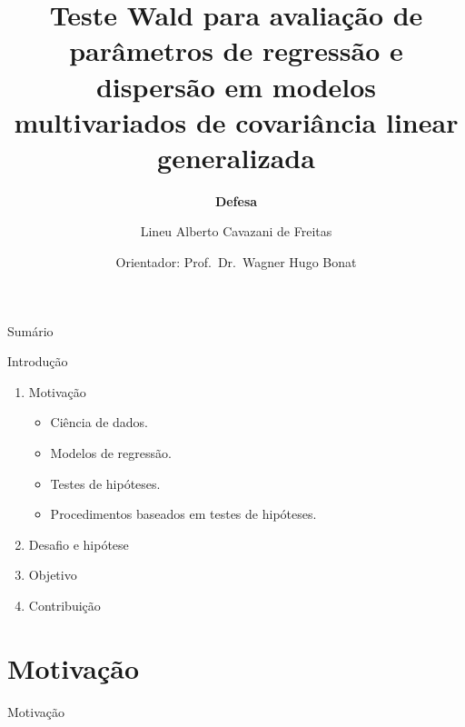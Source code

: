 \documentclass[
  ignorenonframetext,
  serif,
  professionalfont,
  usenames,
  dvipsnames,
  aspectratio = 169]{beamer}
\title{\textbf{Teste Wald para avaliação de parâmetros de regressão e dispersão em modelos multivariados de covariância linear generalizada}\newline}
\subtitle{\textbf{Defesa}}
\author{Lineu Alberto Cavazani de Freitas\newline \and Orientador:
Prof.~Dr.~Wagner Hugo Bonat}
\date{}
\institute{PPG Informática UFPR}
\begin{document}
\frame{\titlepage}

\begin{frame}
\end{frame}

\begin{frame}{Sumário}
\protect\hypertarget{sumuxe1rio}{}
\tableofcontents
\end{frame}

\begin{frame}{Introdução}
\protect\hypertarget{introduuxe7uxe3o}{}
\begin{enumerate}
    \itemsep 2ex
    
  \item Motivação
    \begin{itemize}
      \item Ciência de dados.
      \item Modelos de regressão.
      \item Testes de hipóteses.
      \item Procedimentos baseados em testes de hipóteses.
    \end{itemize}
    
  \item Desafio e hipótese
 
  \item Objetivo
 
  \item Contribuição

\end{enumerate}
\end{frame}

\hypertarget{motivauxe7uxe3o}{%
\section{Motivação}\label{motivauxe7uxe3o}}

\begin{frame}{Motivação}
\end{frame}
\end{document}
